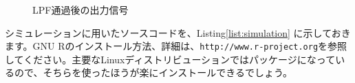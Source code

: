 \begin{figure}
\begin{minipage}{0.5\hsize}
\caption{LPF通過後の出力信号} \label{fig:output}
\end{minipage}
\end{figure}

シミュレーションに用いたソースコードを、Listing\ref{list:simulation}
に示しておきます。GNU Rのインストール方法、詳細は、\texttt{http://www.r-project.org}を参照してください。主要なLinuxディストリビューションではパッケージになっているので、そちらを使ったほうが楽にインストールできるでしょう。

\clearpage
\lstset{language=R,basicstyle=\ttfamily,numbers=left}


